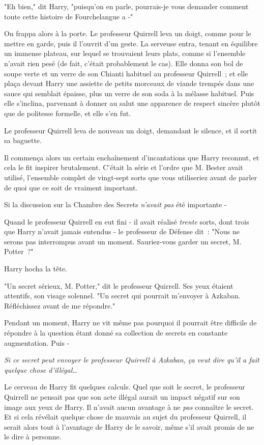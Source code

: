"Eh bien," dit Harry, "puisqu'on en parle, pourrais-je vous demander comment toute cette histoire de Fourchelangue a -"

On frappa alors à la porte. Le professeur Quirrell leva un doigt, comme pour le mettre en garde, puis il l'ouvrit d'un geste. La serveuse entra, tenant en équilibre un immense plateau, sur lequel se trouvaient leurs plats, comme si l'ensemble n'avait rien pesé (de fait, c'était probablement le cas). Elle donna son bol de soupe verte et un verre de son Chianti habituel au professeur Quirrell~; et elle plaça devant Harry une assiette de petits morceaux de viande trempés dans une sauce qui semblait épaisse, plus un verre de son soda à la mélasse habituel. Puis elle s'inclina, parvenant à donner au salut une apparence de respect sincère plutôt que de politesse formelle, et elle s'en fut.

Le professeur Quirrell leva de nouveau un doigt, demandant le silence, et il sortit sa baguette.

Il commença alors un certain enchaînement d'incantations que Harry reconnut, et cela le fit inspirer brutalement. C'était la série et l'ordre que M. Bester avait utilisé, l'ensemble complet de vingt-sept sorts que vous utiliseriez avant de parler de quoi que ce soit de vraiment important.

Si la discussion sur la Chambre des Secrets \emph{n'avait pas} été importante -

Quand le professeur Quirrell en eut fini - il avait réalisé \emph{trente} sorts, dont trois que Harry n'avait jamais entendus - le professeur de Défense dit~: "Nous ne serons pas interrompus avant un moment. Sauriez-vous garder un secret, M. Potter~?"

Harry hocha la tête.

"Un secret sérieux, M. Potter," dit le professeur Quirrell. Ses yeux étaient attentifs, son visage solennel. "Un secret qui pourrait m'envoyer à Azkaban. Réfléchissez avant de me répondre."

Pendant un moment, Harry ne vit même pas pourquoi il pourrait être difficile de répondre à la question étant donné sa collection de secrets en constante augmentation. Puis -

\emph{Si ce secret peut envoyer le professeur Quirrell à Azkaban, ça veut dire qu'il a fait quelque chose d'illégal…}

Le cerveau de Harry fit quelques calculs. Quel que soit le secret, le professeur Quirrell ne pensait pas que son acte illégal aurait un impact négatif sur son image aux yeux de Harry. Il n'avait aucun avantage à ne \emph{pas} connaître le secret. Et si cela révélait quelque chose de mauvais au sujet du professeur Quirrell, il serait alors tout à l'avantage de Harry de le savoir, même s'il avait promis de ne le dire à personne.

